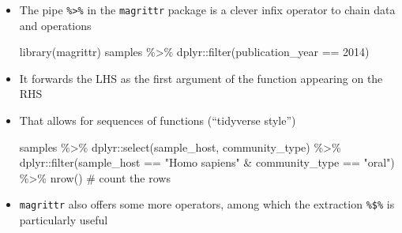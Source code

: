 \documentclass[
  letterpaper,
]{book}
\newenvironment{Shaded}{}{}
\newcommand{\CommentTok}[1]{\textcolor[rgb]{0.42,0.45,0.49}{#1}}
\newcommand{\DecValTok}[1]{\textcolor[rgb]{0.00,0.36,0.77}{#1}}
\newcommand{\FunctionTok}[1]{\textcolor[rgb]{0.44,0.26,0.76}{#1}}
\newcommand{\NormalTok}[1]{\textcolor[rgb]{0.14,0.16,0.18}{#1}}
\newcommand{\SpecialCharTok}[1]{\textcolor[rgb]{0.00,0.36,0.77}{#1}}
\newcommand{\StringTok}[1]{\textcolor[rgb]{0.01,0.18,0.38}{#1}}
\begin{document}
\begin{itemize}
\item
  The pipe \texttt{\%\textgreater{}\%} in the \texttt{magrittr} package
  is a clever infix operator to chain data and operations

\begin{Shaded}
\begin{Highlighting}[]
\FunctionTok{library}\NormalTok{(magrittr)}
\NormalTok{samples }\SpecialCharTok{\%\textgreater{}\%}\NormalTok{ dplyr}\SpecialCharTok{::}\FunctionTok{filter}\NormalTok{(publication\_year }\SpecialCharTok{==} \DecValTok{2014}\NormalTok{)}
\end{Highlighting}
\end{Shaded}
\item
  It forwards the LHS as the first argument of the function appearing on
  the RHS
\item
  That allows for sequences of functions (``tidyverse style'')

\begin{Shaded}
\begin{Highlighting}[]
\NormalTok{samples }\SpecialCharTok{\%\textgreater{}\%}
\NormalTok{dplyr}\SpecialCharTok{::}\FunctionTok{select}\NormalTok{(sample\_host, community\_type) }\SpecialCharTok{\%\textgreater{}\%}
\NormalTok{dplyr}\SpecialCharTok{::}\FunctionTok{filter}\NormalTok{(sample\_host }\SpecialCharTok{==} \StringTok{"Homo sapiens"} \SpecialCharTok{\&}\NormalTok{ community\_type }\SpecialCharTok{==} \StringTok{"oral"}\NormalTok{) }\SpecialCharTok{\%\textgreater{}\%}
\FunctionTok{nrow}\NormalTok{() }\CommentTok{\# count the rows}
\end{Highlighting}
\end{Shaded}
\item
  \texttt{magrittr} also offers some more operators, among which the
  extraction \texttt{\%\$\%} is particularly useful

\begin{Shaded}
\end{Shaded}
\end{itemize}
\end{document}
